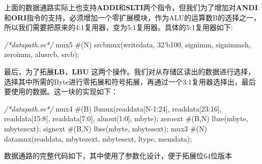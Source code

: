 \documentclass[]{article}
\newenvironment{Shaded}{}{}
\newcommand{\DecValTok}[1]{\textcolor[rgb]{0.25,0.63,0.44}{#1}}
\newcommand{\BaseNTok}[1]{\textcolor[rgb]{0.25,0.63,0.44}{#1}}
\newcommand{\CommentTok}[1]{\textcolor[rgb]{0.38,0.63,0.69}{\textit{#1}}}
\newcommand{\NormalTok}[1]{#1}
\begin{document}
上面的数据通路实际上也支持\textbf{ADDI}和\textbf{SLTI}两个指令，但我们为了增加对\textbf{ANDI}和\textbf{ORI}指令的支持，必须增加一个零扩展模块，作为ALU的运算数B的选择之一，所以我们需要把原来的4:1复用器，变为5:1复用器。具体的5:1复用器如下:

\begin{Shaded}
\begin{Highlighting}[]
\CommentTok{/*datapath.sv*/}
\NormalTok{mux5 #(N)       srcbmux(writedata, }\BaseNTok{32'b100}\NormalTok{, signimm, signimmsh, zeroimm, alusrcb, srcb);}
\end{Highlighting}
\end{Shaded}

最后，为了拓展\textbf{LB}，\textbf{LBU}
这两个操作。我们对从存储区读出的数据进行选择，选择其中所需的Byte进行零拓展和符号拓展，再通过一个3:1复用器选择出，最后要使用的数据。这一块的实现如下：

\begin{Shaded}
\begin{Highlighting}[]
\CommentTok{/*datapath.sv*/}
\NormalTok{mux4 #(B)       lbmux(readdata[N-}\DecValTok{1}\NormalTok{:}\DecValTok{24}\NormalTok{], readdata[}\DecValTok{23}\NormalTok{:}\DecValTok{16}\NormalTok{], readdata[}\DecValTok{15}\NormalTok{:}\DecValTok{8}\NormalTok{],}
\NormalTok{                        readdata[}\DecValTok{7}\NormalTok{:}\DecValTok{0}\NormalTok{], aluout[}\DecValTok{1}\NormalTok{:}\DecValTok{0}\NormalTok{], mbyte);}
\NormalTok{zeroext #(B,N)  lbze(mbyte, mbytezext);}
\NormalTok{signext #(B,N)  lbse(mbyte, mbytesext);}
\NormalTok{mux3 #(N)       datamux(readdata, mbytezext, mbytesext, ltype, memdata);}
\end{Highlighting}
\end{Shaded}

数据通路的完整代码如下，其中使用了参数化设计，便于拓展位64位版本
\end{document}
